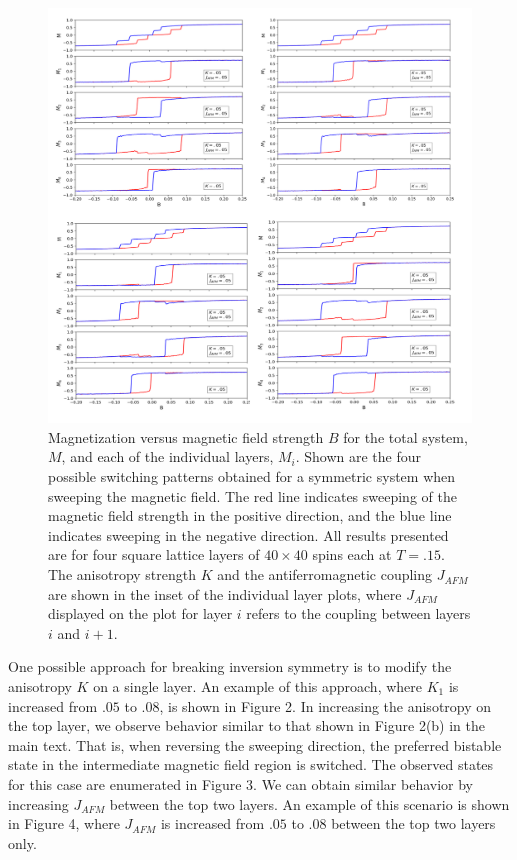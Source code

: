 \documentclass[10pt]{article}
\begin{document}
\begin{figure}[!htb]
\includegraphics[width=\textwidth]{4_patterns_new.png}
\caption{Magnetization versus magnetic field strength $B$ for the total system, $M$, and each of the individual layers, $M_{i}$. Shown are the four possible switching patterns obtained for a symmetric
system when sweeping the magnetic field. The red line indicates sweeping of the magnetic field strength in the positive direction, and the blue line indicates
sweeping in the negative direction. All results presented are for four square lattice layers of $40 \times 40$ spins each at $T = .15$. The anisotropy strength $K$ and the antiferromagnetic coupling $J_{AFM}$
are shown in the inset of the individual layer plots, where $J_{AFM}$ displayed on the plot for layer $i$ refers to the coupling between layers $i$ and $i+1$.  }
\end{figure}

\pagebreak
One possible approach for breaking inversion symmetry is to modify the anisotropy $K$ on a single layer. An example of this approach, where $K_{1}$ is increased from $.05$ to $.08$, is shown in Figure 2. In increasing the anisotropy on the top layer, we observe behavior similar to that shown in Figure 2(b) in the main text. That is,
when reversing the sweeping direction, the preferred bistable state in the intermediate magnetic field region is switched. The observed states for this case are enumerated in Figure 3. We can obtain similar behavior by increasing $J_{AFM}$ between the top two layers. An example of this scenario is shown in Figure 4, where $J_{AFM}$ is increased from $.05$ to $.08$ between the top two layers only.
\end{document}

